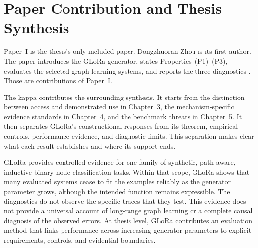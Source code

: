 \section{Paper Contribution and Thesis Synthesis}
\label{sec:glora-interpretation}

Paper~I is the thesis's only included paper.
Dongzhuoran Zhou is its first author.
The paper introduces the GLoRa generator, states Properties~(P1)--(P3), evaluates the selected graph learning systems, and reports the three diagnostics \cite{zhou2025glora}.
Those are contributions of Paper~I.

The kappa contributes the surrounding synthesis.
It starts from the distinction between access and demonstrated use in Chapter~3, the mechanism-specific evidence standards in Chapter~4, and the benchmark threats in Chapter~5.
It then separates GLoRa's constructional responses from its theorem, empirical controls, performance evidence, and diagnostic limits.
This separation makes clear what each result establishes and where its support ends.

GLoRa provides controlled evidence for one family of synthetic, path-aware, inductive binary node-classification tasks.
Within that scope, GLoRa shows that many evaluated systems cease to fit the examples reliably as the generator parameter grows, although the intended function remains expressible.
The diagnostics do not observe the specific traces that they test.
This evidence does not provide a universal account of long-range graph learning or a complete causal diagnosis of the observed errors.
At thesis level, GLoRa contributes an evaluation method that links performance across increasing generator parameters to explicit requirements, controls, and evidential boundaries.
